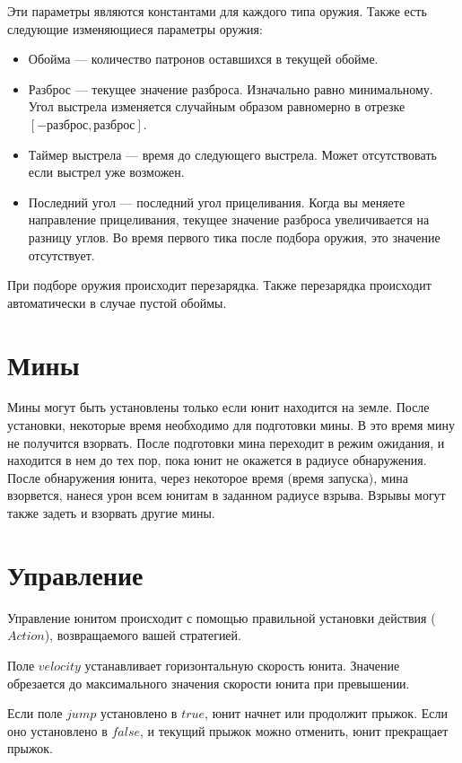 Эти параметры являются константами для каждого типа оружия. Также есть следующие изменяющиеся параметры оружия:
\begin{itemize}
      \item Обойма --- количество патронов оставшихся в текущей обойме.
      \item Разброс --- текущее значение разброса. Изначально равно минимальному.
            Угол выстрела изменяется случайным образом равномерно в отрезке $[-разброс, разброс]$.
      \item Таймер выстрела --- время до следующего выстрела. Может отсутствовать если выстрел уже возможен.
      \item Последний угол --- последний угол прицеливания. Когда вы меняете направление прицеливания,
            текущее значение разброса увеличивается на разницу углов.
            Во время первого тика после подбора оружия, это значение отсутствует.
\end{itemize}

При подборе оружия происходит перезарядка.
Также перезарядка происходит автоматически в случае пустой обоймы.

\section{Мины}

Мины могут быть установлены только если юнит находится на земле.
После установки, некоторые время необходимо для подготовки мины. В это время мину не получится взорвать.
После подготовки мина переходит в режим ожидания, и находится в нем до тех пор,
пока юнит не окажется в радиусе обнаружения.
После обнаружения юнита, через некоторое время (время запуска), мина взорвется, нанеся урон всем юнитам в заданном радиусе взрыва.
Взрывы могут также задеть и взорвать другие мины.

\section{Управление}

Управление юнитом происходит с помощью правильной установки действия ($Action$), возвращаемого вашей стратегией.

Поле $velocity$ устанавливает горизонтальную скорость юнита. Значение обрезается до максимального значения скорости юнита при превышении.

Если поле $jump$ установлено в $true$, юнит начнет или продолжит прыжок.
Если оно установлено в $false$, и текущий прыжок можно отменить, юнит прекращает прыжок.

